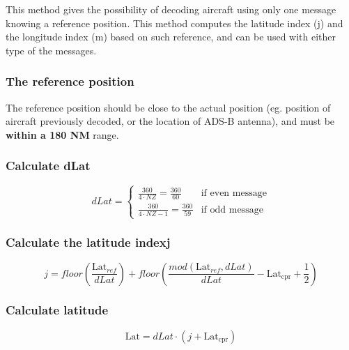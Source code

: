 This method gives the possibility of decoding aircraft using only one message knowing a reference position. This method computes the latitude index (j) and the longitude index (m) based on such reference, and can be used with either type of the messages.

\subsubsection{The reference position}\label{the-reference-position}

The reference position should be close to the actual position (eg. position of aircraft previously decoded, or the location of ADS-B antenna), and must be \textbf{within a 180 NM} range.

\subsubsection{Calculate dLat}\label{calculate-dlat}

\begin{equation}
  dLat =
  \begin{cases}
   \frac{360}{4 \cdot NZ} = \frac{360}{60}          & \text{if even message}  \\
   \frac{360}{4 \cdot NZ - 1}  = \frac{360}{59}     & \text{if odd message}
  \end{cases}
\end{equation}

\subsubsection{Calculate the latitude indexj} \label{calculate-the-latitude-index-j-1}

\begin{equation}
  j = floor \left (\frac{\mathrm{Lat}_{ref}}{dLat} \right) + floor \left( \frac{mod(\mathrm{Lat}_{ref}, dLat)}{dLat}  - \mathrm{Lat}_\mathrm{cpr}  + \frac{1}{2} \right)
\end{equation}

\subsubsection{Calculate latitude}\label{calculate-latitude-1}

\begin{equation}
  \mathrm{Lat} = dLat \cdot (j + \mathrm{Lat}_\mathrm{cpr})
\end{equation}


